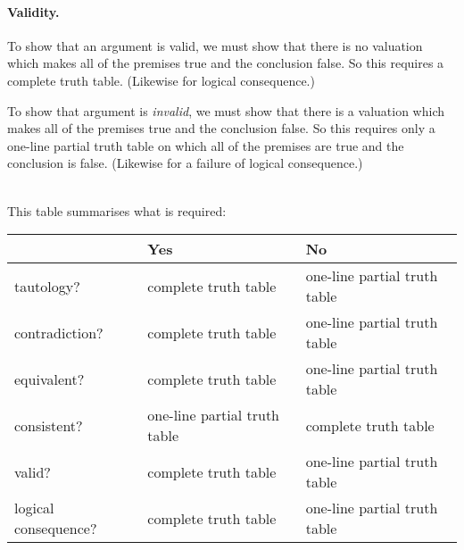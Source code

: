 \paragraph{Validity.}
To show that an argument is valid, we must show that there is no valuation which makes all of the premises true and the conclusion false. So this  requires a complete truth table.  (Likewise for logical consequence.)

To show that argument is \emph{invalid}, we must show that there is a valuation which makes all of the premises true and the conclusion false. So this requires only a one-line partial truth table on which all of the premises are true and the conclusion is false. (Likewise for a failure of logical consequence.)


\
\\This table summarises what is required:

\begin{center}
	\begin{tabular}{l l l}
		& \textbf{Yes} & \textbf{No}\\
		\hline
		tautology? & complete truth table & one-line partial truth table\\
		contradiction? &  complete truth table  & one-line partial truth table\\
		equivalent? & complete truth table & one-line partial truth table\\
		consistent? & one-line partial truth table & complete truth table\\
		valid? & complete truth table & one-line partial truth table\\
		logical consequence? & complete truth table & one-line partial truth table\\
	\end{tabular}
\end{center}
\label{table.CompleteVsPartial}

